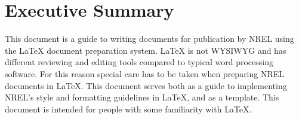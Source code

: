 \chapter*{Executive Summary}
This document is a guide to writing documents for publication by NREL using the LaTeX document preparation system. LaTeX is not WYSIWYG and has different reviewing and editing tools compared to typical word processing software. For this reason special care has to be taken when preparing NREL documents in LaTeX. This document serves both as a guide to implementing NREL's style and formatting guidelines in LaTeX, and as a template. This document is intended for people with some familiarity with LaTeX.